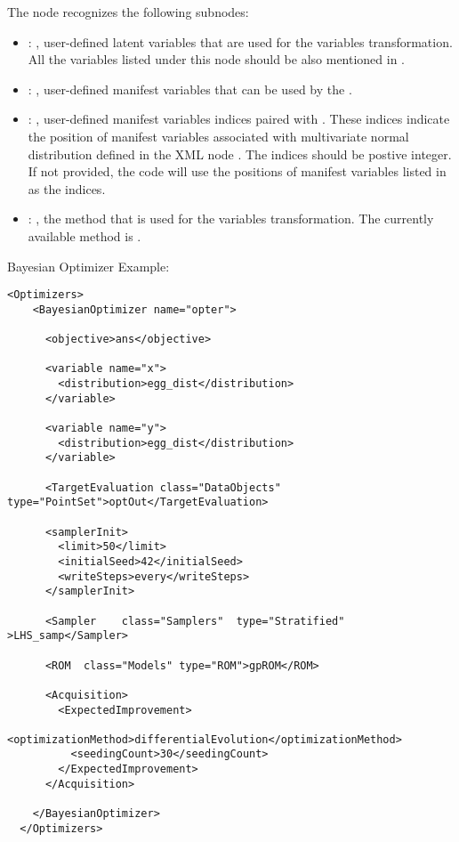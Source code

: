 \begin{itemize}
      The  node recognizes the following subnodes:
      \begin{itemize}
        \item {}: ,
          user-defined latent variables that are used for the variables transformation.
          All the variables listed under this node should be also mentioned in .

        \item {}: ,
          user-defined manifest variables that can be used by the .

        \item {}: ,
          user-defined manifest variables indices paired with .
          These indices indicate the position of manifest variables associated with multivariate
          normal               distribution defined in the XML node .
          The indices should be postive integer. If not provided, the code will use the positions
          of manifest variables listed in  as the indices.

        \item {}: ,
          the method that is used for the variables transformation. The currently available method
          is .
      \end{itemize}
  \end{itemize}

\hspace{24pt}
Bayesian Optimizer Example:
\begin{lstlisting}[style=XML]
  <Optimizers>
    <BayesianOptimizer name="opter">

      <objective>ans</objective>

      <variable name="x">
        <distribution>egg_dist</distribution>
      </variable>

      <variable name="y">
        <distribution>egg_dist</distribution>
      </variable>

      <TargetEvaluation class="DataObjects" type="PointSet">optOut</TargetEvaluation>

      <samplerInit>
        <limit>50</limit>
        <initialSeed>42</initialSeed>
        <writeSteps>every</writeSteps>
      </samplerInit>

      <Sampler    class="Samplers"  type="Stratified" >LHS_samp</Sampler>

      <ROM  class="Models" type="ROM">gpROM</ROM>

      <Acquisition>
        <ExpectedImprovement>
          <optimizationMethod>differentialEvolution</optimizationMethod>
          <seedingCount>30</seedingCount>
        </ExpectedImprovement>
      </Acquisition>

    </BayesianOptimizer>
  </Optimizers>
\end{lstlisting}

